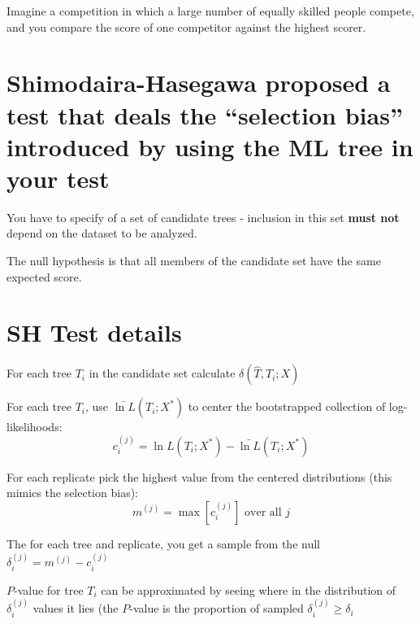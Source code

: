 \documentclass[landscape]{foils}
\begin{document}
Imagine a competition in which a large number of equally skilled people compete, and you compare the score of one competitor against the highest scorer.

\myNewSlide
\section*{Shimodaira-Hasegawa proposed a test that deals the ``selection bias'' introduced by using the ML tree in your test}
You have to specify of a set of candidate trees - inclusion in this set {\bf must not} depend on the dataset to be analyzed.

The null hypothesis is that all members of the candidate set have the same expected score.

\myNewSlide
\section*{SH Test details}
\normalsize
\begin{compactitem}
	\item For each tree $T_i$ in the candidate set calculate $\delta(\hat{T}, T_i;X)$
	\item For each tree $T_i$, use $\bar{\ln L}(T_i;X^{\ast})$ to center the bootstrapped collection of log-likelihoods:
		$$c_i^{(j)} = {\ln L}(T_i;X^{\ast})-\bar{\ln L}(T_i;X^{\ast})$$
	\item For each replicate pick the highest value from the centered distributions (this mimics the selection bias): $$m^{(j)} = \max\left[c_i^{(j)}\right] \mbox{ over all } j$$
	\item The for each tree and replicate, you get a sample from the null $\delta_i^{(j)} = m^{(j)} - c_i^{(j)}$
	\item $P$-value for tree $T_i$ can be approximated by seeing where in the distribution of $\delta_i^{(j)}$ values it lies (the $P$-value is the proportion of sampled $\delta_i^{(j)} \geq \delta_i$
\end{compactitem}

\myNewSlide
\end{document}
